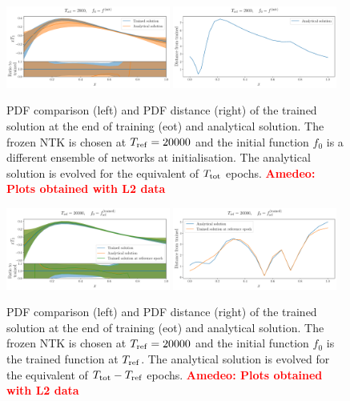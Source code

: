 \documentclass[11pt]{article}
\newcommand{\ac}[1]{\textcolor{red}{\textbf{Amedeo: #1}}}
\begin{document}
\begin{figure}[h]
  \centering
  \includegraphics[width=0.48\textwidth]{plots/pdf_plot_init.pdf}
  \includegraphics[width=0.48\textwidth]{plots/distance_plot_init.pdf}
  \caption{PDF comparison (left) and PDF distance (right) of the trained
  solution at the end of training (eot) and analytical solution. The frozen NTK
  is chosen at $T_{\rm ref} = 20000$ and the initial function $f_0$ is a
  different ensemble of networks at initialisation. The analytical solution is
  evolved for the equivalent of $T_{\rm tot}$ epochs. \ac{Plots obtained with L2
  data}}
  \label{fig:xT3_analytical_init}
\end{figure}

\begin{figure}[h]
  \centering
  \includegraphics[width=0.48\textwidth]{plots/pdf_plot_ref_20000.pdf}
  \includegraphics[width=0.48\textwidth]{plots/distance_plot_ref_20000.pdf}
  \caption{PDF comparison (left) and PDF distance (right) of the trained
  solution at the end of training (eot) and analytical solution. The frozen NTK
  is chosen at $T_{\rm ref} = 20000$ and the initial function $f_0$ is the
  trained function at $T_{\rm ref}$. The analytical solution is evolved for the
  equivalent of $T_{\rm tot} - T_{\rm ref}$ epochs. \ac{Plots obtained with L2
  data}}
  \label{fig:xT3_analytical_ref}
\end{figure}
\end{document}
